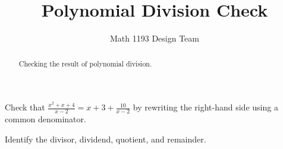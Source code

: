 \documentclass[noauthor]{ximera}
\title{Polynomial Division Check}
\author{Math 1193 Design Team}
\begin{document}
\begin{abstract}
    Checking the result of polynomial division.
\end{abstract}
\maketitle

Check that \(\frac{x^2 + x + 4}{x - 2} = x + 3 + \frac{10}{x - 2}\) by
rewriting the right-hand side using a common denominator. 

Identify the divisor, dividend, quotient, and remainder.
\end{document}
